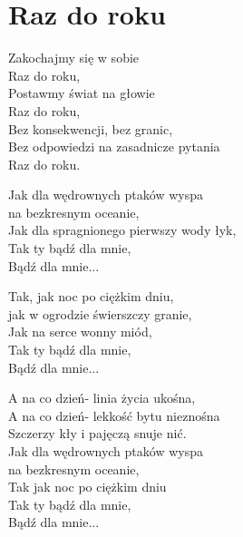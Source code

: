 \section{Raz do roku}
\begin{text}
\vin Zakochajmy się w sobie\\
\vin Raz do roku, \\
\vin Postawmy świat na głowie\\
\vin Raz do roku, \\
\vin Bez konsekwencji, bez granic, \\
\vin Bez odpowiedzi na zasadnicze pytania\\
\vin Raz do roku. 

Jak dla wędrownych ptaków wyspa\\
na bezkresnym oceanie, \\
Jak dla spragnionego pierwszy wody łyk, \\
Tak ty bądź dla mnie, \\
Bądź dla mnie... 

Tak, jak noc po ciężkim dniu,\\
jak w ogrodzie świerszczy granie,\\
Jak na serce wonny miód,\\
Tak ty bądź dla mnie,\\
Bądź dla mnie...

A na co dzień- linia życia ukośna, \\
A na co dzień- lekkość bytu nieznośna \\
Szczerzy kły i pajęczą snuje nić. \\

Jak dla wędrownych ptaków wyspa\\
na bezkresnym oceanie,\\
Tak jak noc po ciężkim dniu\\
Tak ty bądź dla mnie,\\
Bądź dla mnie...
\end{text}